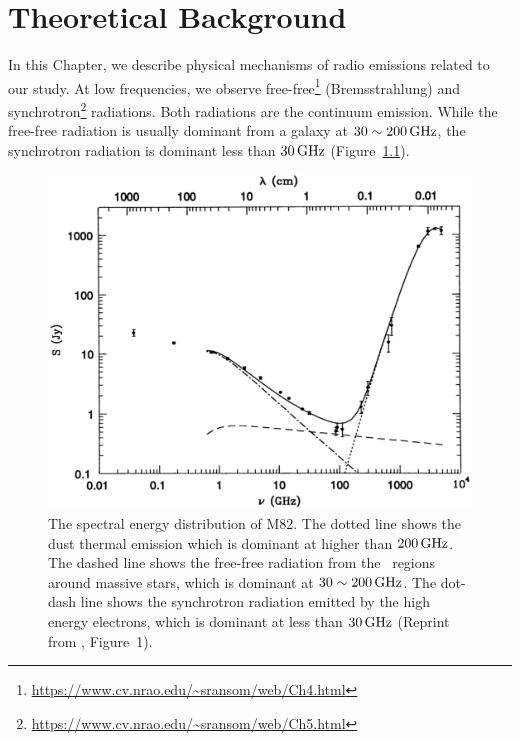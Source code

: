 \chapter{Theoretical Background}\label{chap:theory}
\begin{chapabstract}

    In this Chapter, we describe physical mechanisms of radio emissions related to our study.
    At low frequencies, we observe free-free\footnote{\url{https://www.cv.nrao.edu/~sransom/web/Ch4.html}} (Bremsstrahlung) and synchrotron\footnote{\url{https://www.cv.nrao.edu/~sransom/web/Ch5.html}} radiations.
    Both radiations are the continuum emission.
    While the free-free radiation is usually dominant from a galaxy at $30 \sim 200\,\mathrm{GHz}$, the synchrotron radiation is dominant less than $30\,\mathrm{GHz}$ (Figure~\ref{fig:Condon1992_figure1}).\\ \vspace{0.2cm}
\begin{figure}[htbp]
	\centering
	\includegraphics[width=.8\linewidth]{Chapter_2/Figures/Condon1992_Figure1.png}
    \caption[The spectral energy distribution of M82]{\label{fig:Condon1992_figure1}
        The spectral energy distribution of M82.
        The dotted line shows the dust thermal emission which is dominant at higher than $200\,\mathrm{GHz}$.
        The dashed line shows the free-free radiation from the \ih~regions around massive stars, which is dominant at $30 \sim 200\,\mathrm{GHz}$.
        The dot-dash line shows the synchrotron radiation emitted by the high energy electrons, which is dominant at less than $30\,\mathrm{GHz}$
        (Reprint from \citealt{Condon1992a}, Figure~1).
    }
\end{figure}

\end{chapabstract}



